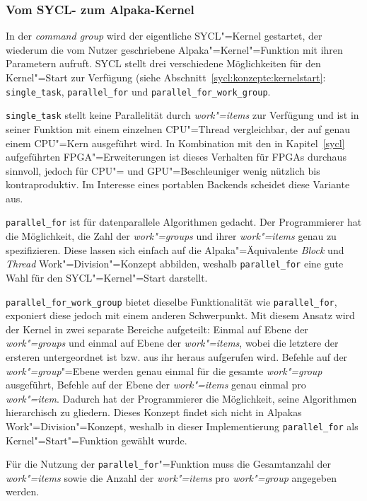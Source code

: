 \subsubsection{Vom SYCL- zum Alpaka-Kernel}
\label{implementierung:task:kernel:launch}

In der \textit{command group} wird der eigentliche SYCL"=Kernel gestartet, der
wiederum die vom Nutzer geschriebene Alpaka"=Kernel"=Funktion mit ihren
Parametern aufruft. SYCL stellt drei verschiedene Möglichkeiten für den
Kernel"=Start zur Verfügung (siehe Abschnitt~\ref{sycl:konzepte:kernelstart}:
\texttt{single\_task}, \texttt{parallel\_for} und
\texttt{parallel\_for\_work\_group}.

\texttt{single\_task} stellt keine Parallelität durch \textit{work"=items} zur
Verfügung und ist in seiner Funktion mit einem einzelnen CPU"=Thread
vergleichbar, der auf genau einem CPU"=Kern ausgeführt wird. In Kombination mit
den in Kapitel~\ref{sycl} aufgeführten FPGA"=Erweiterungen ist dieses Verhalten
für FPGAs durchaus sinnvoll, jedoch für CPU"= und GPU"=Beschleuniger wenig
nützlich bis kontraproduktiv. Im Interesse eines portablen Backends scheidet
diese Variante aus.

\texttt{parallel\_for} ist für datenparallele Algorithmen gedacht. Der
Programmierer hat die Möglichkeit, die Zahl der \textit{work"=groups} und ihrer
\textit{work"=items} genau zu spezifizieren. Diese lassen sich einfach auf die
Alpaka"=Äquivalente \textit{Block} und \textit{Thread} Work"=Division"=Konzept
abbilden, weshalb \texttt{parallel\_for} eine gute Wahl für den
SYCL"=Kernel"=Start darstellt.

\texttt{parallel\_for\_work\_group} bietet dieselbe Funktionalität wie
\texttt{parallel\_for}, exponiert diese jedoch mit einem anderen Schwerpunkt.
Mit diesem Ansatz wird der Kernel in zwei separate Bereiche aufgeteilt: Einmal
auf Ebene der \textit{work"=groups} und einmal auf Ebene der
\textit{work"=items}, wobei die letztere der ersteren untergeordnet ist bzw.
aus ihr heraus aufgerufen wird. Befehle auf der \textit{work"=group}"=Ebene
werden genau einmal für die gesamte \textit{work"=group} ausgeführt, Befehle auf
der Ebene der \textit{work"=items} genau einmal pro \textit{work"=item}. Dadurch
hat der Programmierer die Möglichkeit, seine Algorithmen hierarchisch zu
gliedern. Dieses Konzept findet sich nicht in Alpakas Work"=Division"=Konzept,
weshalb in dieser Implementierung \texttt{parallel\_for} als
Kernel"=Start"=Funktion gewählt wurde.

Für die Nutzung der \texttt{parallel\_for}"=Funktion muss die Gesamtanzahl der
\textit{work"=items} sowie die Anzahl der \textit{work"=items} pro
\textit{work"=group} angegeben werden.

